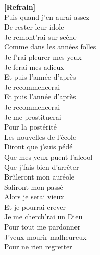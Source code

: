 \documentclass{novel}
\begin{document}
\begin{multicols}{2}
\textbf{[Refrain]}\\

Puis quand j'en aurai assez\\
De rester leur idole\\
Je remont'rai sur scène\\
Comme dans les années folles\\
Je f'rai pleurer mes yeux\\
Je ferai mes adieux\\

Et puis l'année d'après\\
Je recommencerai\\
Et puis l'année d'après\\
Je recommencerai\\
Je me prostituerai\\
Pour la postérité\\

Les nouvelles de l'école\\
Diront que j'suis pédé\\
Que mes yeux puent l'alcool\\
Que j'fais bien d'arrêter\\
Brûleront mon auréole\\
Saliront mon passé\\

Alors je serai vieux\\
Et je pourrai crever\\
Je me cherch'rai un Dieu\\
Pour tout me pardonner\\
J'veux mourir malheureux\\
Pour ne rien regretter
\end{multicols}
\newpage
\normalsize
\end{document}
